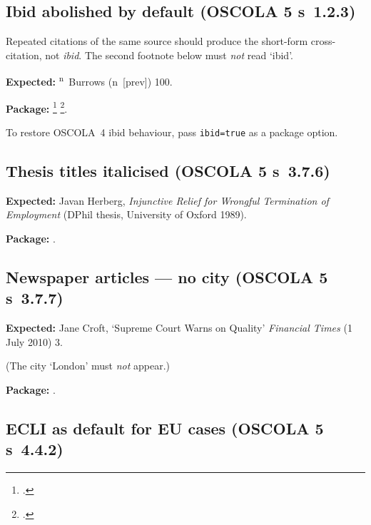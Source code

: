 \documentclass[12pt]{article}
\newcommand{\expected}[1]{\par\textbf{Expected:} #1}
\newcommand{\pkg}{\par\textbf{Package:} }
\begin{document}
\subsection{Ibid abolished by default (OSCOLA 5 s~1.2.3)}

Repeated citations of the same source should produce the short-form
cross-citation, not \emph{ibid}.  The second footnote below must
\emph{not} read `ibid'.

\expected{%
  \textsuperscript{n}~Burrows (n~[prev]) 100.%
}

\pkg
\footcite[317]{burrows04}%
\footcite[100]{burrows04}.

To restore OSCOLA~4 ibid behaviour, pass \texttt{ibid=true} as a
package option.

\subsection{Thesis titles italicised (OSCOLA 5 s~3.7.6)}

\expected{%
  Javan Herberg, \emph{Injunctive Relief for Wrongful Termination of
  Employment} (DPhil thesis, University of Oxford 1989).%
}

\pkg
\cite{herberg89}.

\subsection{Newspaper articles — no city (OSCOLA 5 s~3.7.7)}

\expected{%
  Jane Croft, `Supreme Court Warns on Quality'
  \emph{Financial Times} (1 July 2010) 3.%
}

(The city `London' must \emph{not} appear.)

\pkg
\cite{croft}.

\subsection{ECLI as default for EU cases (OSCOLA 5 s~4.4.2)}
\end{document}
